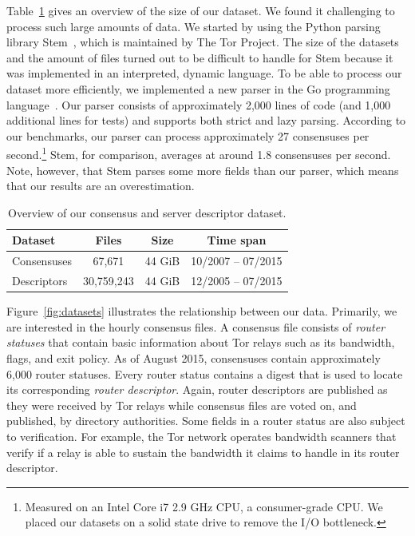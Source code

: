 Table~\ref{tab:collector-dataset} gives an overview of the size of our dataset.
We found it challenging to process such large amounts of data.  We started by
using the Python parsing library Stem~\cite{stem}, which is maintained by The
Tor Project.  The size of the datasets and the amount of files turned out to be
difficult to handle for Stem because it was implemented in an interpreted,
dynamic language.  To be able to process our dataset more efficiently, we
implemented a new parser in the Go programming language~\cite{zoossh}.  Our
parser consists of approximately 2,000 lines of code (and 1,000 additional lines
for tests) and supports both strict and lazy parsing.  According to our
benchmarks, our parser can process approximately 27 consensuses per
second.\footnote{Measured on an Intel Core i7 2.9 GHz CPU, a consumer-grade CPU.
We placed our datasets on a solid state drive to remove the I/O bottleneck.}
Stem, for comparison, averages at around 1.8 consensuses per second.  Note,
however, that Stem parses some more fields than our parser, which means that our
results are an overestimation.

\begin{table}[t]
\centering
\begin{tabular}{l c c c}
\textbf{Dataset} & \textbf{Files} & \textbf{Size} & \textbf{Time span} \\
\hline
Consensuses & 67,671 & 44 GiB & 10/2007 -- 07/2015 \\
Descriptors & 30,759,243 & 44 GiB & 12/2005 -- 07/2015 \\
\end{tabular}
\caption{Overview of our consensus and server descriptor dataset.}
\label{tab:collector-dataset}
\end{table}

Figure~\ref{fig:datasets} illustrates the relationship between our data.
Primarily, we are interested in the hourly consensus files.  A consensus file
consists of \emph{router statuses} that contain basic information about Tor
relays such as its bandwidth, flags, and exit policy.  As of August 2015,
consensuses contain approximately 6,000 router statuses.  Every router status
contains a digest that is used to locate its corresponding \emph{router
descriptor}.  Again, router descriptors are published as they were received by
Tor relays while consensus files are voted on, and published, by directory
authorities.  Some fields in a router status are also subject to verification.
For example, the Tor network operates bandwidth scanners that verify if a relay
is able to sustain the bandwidth it claims to handle in its router descriptor.

